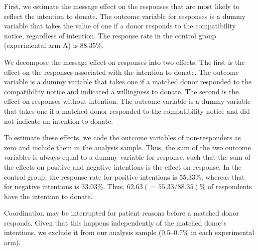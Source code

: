 \documentclass[
  11pt,
  a4paper
]{article}
\begin{document}
First, we estimate the message effect on the responses that are most likely to reflect the intention to donate. The outcome variable for responses is a dummy variable that takes the value of one if a donor responds to the compatibility notice, regardless of intention. The response rate in the control group (experimental arm A) is \(88.35\)\%.

We decompose the message effect on responses into two effects. The first is the effect on the responses associated with the intention to donate. The outcome variable is a dummy variable that takes one if a matched donor responded to the compatibility notice and indicated a willingness to donate. The second is the effect on responses without intention. The outcome variable is a dummy variable that takes one if a matched donor responded to the compatibility notice and did not indicate an intention to donate.

To estimate these effects, we code the outcome variables of non-responders as zero and include them in the analysis sample. Thus, the sum of the two outcome variables is always equal to a dummy variable for response, such that the sum of the effects on positive and negative intentions is the effect on response. In the control group, the response rate for positive intentions is \(55.33\)\%, whereas that for negative intentions is \(33.03\)\%. Thus, \(62.63(=55.33/88.35)\)\% of respondents have the intention to donate.

Coordination may be interrupted for patient reasons before a matched donor responds. Given that this happens independently of the matched donor's intentions, we exclude it from our analysis sample (\(0.5\)--\(0.7\)\% in each experimental arm).
\end{document}
